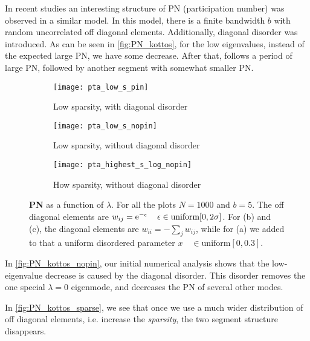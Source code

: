In recent studies \cite{bodyfelt_unpub} an interesting structure of
PN (participation number) was observed in a similar model. In this model,
there is a finite bandwidth $b$ with random uncorrelated off diagonal elements.
Additionally, diagonal disorder was introduced. As can be seen
in \autoref{fig:PN_kottos}, for the low eigenvalues, instead of the 
expected large PN, we have some decrease. After that, follows a period
of large PN, followed by another segment with somewhat smaller PN.





\begin{figure}[H]
  \begin{subfigure}{.5\linewidth}
    \texttt{[image: pta\_low\_s\_pin]}
    \caption{Low sparsity, with diagonal disorder}\label{fig:PN_kottos}
  \end{subfigure}      

  \begin{subfigure}{.5\linewidth}
    \texttt{[image: pta\_low\_s\_nopin]}
    \caption{Low sparsity, without diagonal disorder}\label{fig:PN_kottos_nopin}
  \end{subfigure}
    \begin{subfigure}{.5\linewidth}

\texttt{[image: pta\_highest\_s\_log\_nopin]}
  \caption{How sparsity, without diagonal disorder}\label{fig:PN_kottos_sparse}
    
  \end{subfigure}

  \caption{{\bf PN} as a function of $\lambda$.
  For all the plots $N=1000$ and $b=5$. 
  The off diagonal elements are 
  $w_{ij} = \mbox{e}^{-\epsilon} \quad \, \epsilon \in \textrm{uniform} [0,2\sigma]$.
  For (b) and (c), the diagonal elements are $w_{ii} = -\sum_j w_{ij}$, while for 
  (a) we added to that a uniform disordered parameter $x \quad \in \textrm{uniform} [0,0.3]$.
  }
\end{figure}



In \autoref{fig:PN_kottos_nopin}, our initial numerical analysis shows that the low-eigenvalue decrease
is caused by the diagonal disorder. This disorder removes the one special 
$\lambda=0$ eigenmode, and decreases the PN of several other modes.



In \autoref{fig:PN_kottos_sparse}, we see that once we use a much wider
distribution of off diagonal elements, i.e. increase the \emph{sparsity}, 
the two segment structure disappears.




